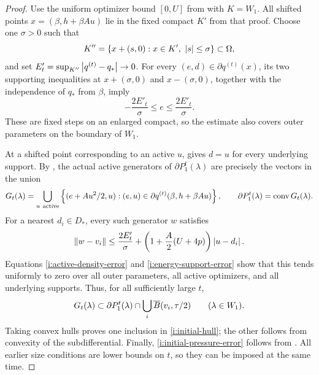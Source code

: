 \begin{proof}
Use the uniform optimizer bound \([0,U]\) from
 with \(K=W_1\).  All shifted points
\(x=(\beta,h+\beta Au)\) lie in the fixed compact \(K'\) from that
proof.  Choose one \(\sigma>0\) such that
\[
 K''=\{x+(s,0):x\in K',\ \abs{s}\le\sigma\}\subset\Omega,
\]
and set \(E'_t=\sup_{K''}\left|q^{(t)}-q_*\right|\to0\).
For every \((e,d)\in\partial q^{(t)}(x)\), its two supporting
inequalities at \(x+(\sigma,0)\) and \(x-(\sigma,0)\), together
with the independence of \(q_*\) from \(\beta\), imply
\begin{equation}
 -\frac{2E'_t}{\sigma}\le e\le\frac{2E'_t}{\sigma}.
 \label{i:energy-support-error}
\end{equation}
These are fixed steps on an enlarged compact, so the estimate also
covers outer parameters on the boundary of \(W_1\).

At a shifted point corresponding to an active \(u\),
 gives \(d=u\) for every underlying support.
By , the actual active generators of
\(\partial P_1^t(\lambda)\) are precisely the vectors in the union
\[
 G_t(\lambda)=
 \bigcup_{u\ \mathrm{active}}
   \left\{(e+Au^2/2,u):(e,u)\in
           \partial q^{(t)}(\beta,h+\beta Au)\right\},
 \qquad
 \partial P_1^t(\lambda)=\operatorname{conv} G_t(\lambda).
\]
For a nearest \(d_i\in D_*\), every such generator \(w\)
satisfies
\[
 \left\lVert w-v_i\right\rVert
 \le\frac{2E'_t}{\sigma}
       +\left(1+\frac A2(U+4p)\right)\left|u-d_i\right|.
\]
Equations \eqref{i:active-density-error} and
\eqref{i:energy-support-error} show that this tends uniformly to zero
over all outer parameters, all active optimizers, and all underlying
supports.  Thus, for all sufficiently large \(t\),
\[
 G_t(\lambda)\subset
       \partial P_1^t(\lambda)\cap
       \bigcup_i\overline B(v_i,\tau/2)
       \qquad(\lambda\in W_1).
\]
Taking convex hulls proves one inclusion in \eqref{i:initial-hull};
the other follows from convexity of the subdifferential.  Finally,
\eqref{i:initial-pressure-error} follows from
.  All earlier size conditions are lower
bounds on \(t\), so they can be imposed at the same time.
\end{proof}
